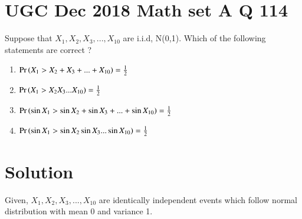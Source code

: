 \documentclass[journal,12pt,twocolumn]{IEEEtran}
\begin{document}
\section*{UGC Dec 2018 Math set A Q 114 }
    Suppose that $X_1,X_2,X_3,...,X_{10}$ are i.i.d, N(0,1). Which of the following statements are correct ?
\begin{enumerate}[label = (\Alph*)]
    \item $\Pr\left(X_1>X_2+X_3+...+X_{10}\right)=\frac{1}{2}$
    \item $\Pr\left(X_1>X_2X_3...X_{10}\right)=\frac{1}{2}$
    \item $\Pr\left(\sin{X_1}>\sin{X_2}+\sin{X_3}+...+\sin{X_{10}}\right)=\frac{1}{2}$
    \item $\Pr\left(\sin{X_1}>\sin{X_2}\sin{X_3}...\sin{X_{10}}\right)=\frac{1}{2}$
\end{enumerate}
\section*{Solution}
Given, $X_1,X_2,X_3,...,X_{10}$ are identically independent events which follow normal distribution with mean 0 and variance 1.\\
\end{document}
